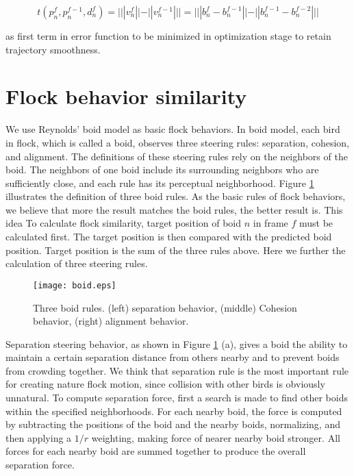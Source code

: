 \begin{equation}\label{eq:4}
 t(p_n^f, p_n^{f-1},d_n^f) = |||v_n^f||-||v_n^{f-1}||| = |||b_n^f-b_n^{f-1}|| - ||b_n^{f-1}-b_n^{f-2}|||
\end{equation}

as first term in error function to be minimized in optimization stage to retain trajectory smoothness.


\section{Flock behavior similarity}


We use Reynolds' boid model as basic flock behaviors. In boid model, each bird in flock, which is called a boid, observes three steering rules: separation, cohesion, and alignment. The definitions of these steering rules rely on the neighbors of the boid. The neighbors of one boid include its surrounding neighbors who are sufficiently close, and each rule has its perceptual neighborhood. Figure \ref{figure:boid} illustrates the definition of three boid rules. As the basic rules of flock behaviors, we believe that more the result matches the boid rules, the better result is. This idea  To calculate flock similarity, target position of boid $n$ in frame $f$ must be calculated first. The target position is then compared with the predicted boid position. Target position is the sum of the three rules above. Here we further the calculation of three steering rules.


\begin{figure}[h]
 \begin{center}
  \texttt{[image: boid.eps]}
 \end{center}
 \caption{Three boid rules. (left) separation behavior, (middle) Cohesion behavior, (right) alignment behavior.}
 \label{figure:boid}
\end{figure}


Separation steering behavior, as shown in Figure \ref{figure:boid} (a), gives a boid the ability to maintain a certain separation distance from others nearby and to prevent boids from crowding together. We think that separation rule is the most important rule for creating nature flock motion, since collision with other birds is obviously unnatural. To compute separation force, first a search is made to find other boids within the specified neighborhoods. For each nearby boid, the force is computed by subtracting the positions of the boid and the nearby boids, normalizing, and then applying a $1/r$ weighting, making force of nearer nearby boid stronger. All forces for each nearby boid are summed together to produce the overall separation force.


